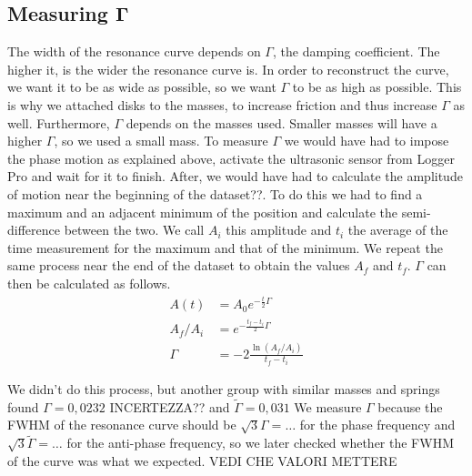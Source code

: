 \documentclass{article}
\begin{document}
\subsection{Measuring $\bm \Gamma$}
The width of the resonance curve depends on $\Gamma$, the damping coefficient. The higher it, is the wider the resonance curve is. In order to reconstruct the curve, we want it to be as wide as possible, so we want $\Gamma$ to be as high as possible. This is why we attached disks to the masses, to increase friction and thus increase $\Gamma$ as well. Furthermore, $\Gamma$ depends on the masses used. Smaller masses will have a higher $\Gamma$, so we used a small mass. %
To measure $\Gamma$ we would have had to impose the phase motion as explained above, activate the ultrasonic sensor from Logger Pro and wait for it to finish. After, we would have had to calculate the amplitude of motion near the beginning of the dataset??. To do this we had to find a maximum and an adjacent minimum of the position and calculate the semi-difference between the two. We call $A_i$ this amplitude and $t_i$ the average of the time measurement for the maximum and that of the minimum. We repeat the same process near the end of the dataset to obtain the values $A_f$ and $t_f$. $\Gamma$ can then be calculated as follows.
\begin{align}
    A(t) &= A_0 e^{-\frac{t}{2} \Gamma} \\
    A_f / A_i &= e^{-\frac{t_f-t_i}{2} \Gamma} \\
    \Gamma &= -2 \frac{ \ln(A_f / A_i) }{ t_f-t_i }
\end{align}

We didn't do this process, but another group with similar masses and springs found $\Gamma = 0,0232$ INCERTEZZA?? and $\tilde \Gamma = 0,031$
We measure $\Gamma$ because the FWHM of the resonance curve should be $\sqrt 3 \Gamma = \dots$ for the phase frequency and $\sqrt 3 \tilde \Gamma = \dots$ for the anti-phase frequency, so we later checked whether the FWHM of the curve was what we expected. VEDI CHE VALORI METTERE


\end{document}
